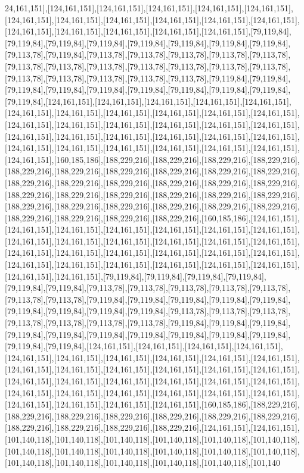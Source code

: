 24,161,151],[124,161,151],[124,161,151],[124,161,151],[124,161,151],[124,161,151],[124,161,151],[124,161,151],[124,161,151],[124,161,151],[124,161,151],[124,161,151],[124,161,151],[124,161,151],[124,161,151],[124,161,151],[124,161,151],[79,119,84],[79,119,84],[79,119,84],[79,119,84],[79,119,84],[79,119,84],[79,119,84],[79,119,84],[79,113,78],[79,119,84],[79,113,78],[79,113,78],[79,113,78],[79,113,78],[79,113,78],[79,113,78],[79,113,78],[79,113,78],[79,113,78],[79,113,78],[79,113,78],[79,113,78],[79,113,78],[79,113,78],[79,113,78],[79,113,78],[79,113,78],[79,119,84],[79,119,84],[79,119,84],[79,119,84],[79,119,84],[79,119,84],[79,119,84],[79,119,84],[79,119,84],[79,119,84],[124,161,151],[124,161,151],[124,161,151],[124,161,151],[124,161,151],[124,161,151],[124,161,151],[124,161,151],[124,161,151],[124,161,151],[124,161,151],[124,161,151],[124,161,151],[124,161,151],[124,161,151],[124,161,151],[124,161,151],[124,161,151],[124,161,151],[124,161,151],[124,161,151],[124,161,151],[124,161,151],[124,161,151],[124,161,151],[124,161,151],[124,161,151],[124,161,151],[124,161,151],[124,161,151],[160,185,186],[188,229,216],[188,229,216],[188,229,216],[188,229,216],[188,229,216],[188,229,216],[188,229,216],[188,229,216],[188,229,216],[188,229,216],[188,229,216],[188,229,216],[188,229,216],[188,229,216],[188,229,216],[188,229,216],[188,229,216],[188,229,216],[188,229,216],[188,229,216],[188,229,216],[188,229,216],[188,229,216],[188,229,216],[188,229,216],[188,229,216],[188,229,216],[188,229,216],[188,229,216],[188,229,216],[188,229,216],[188,229,216],[160,185,186],[124,161,151],[124,161,151],[124,161,151],[124,161,151],[124,161,151],[124,161,151],[124,161,151],[124,161,151],[124,161,151],[124,161,151],[124,161,151],[124,161,151],[124,161,151],[124,161,151],[124,161,151],[124,161,151],[124,161,151],[124,161,151],[124,161,151],[124,161,151],[124,161,151],[124,161,151],[124,161,151],[124,161,151],[124,161,151],[124,161,151],[124,161,151],[79,119,84],[79,119,84],[79,119,84],[79,119,84],[79,119,84],[79,119,84],[79,113,78],[79,113,78],[79,113,78],[79,113,78],[79,113,78],[79,113,78],[79,113,78],[79,119,84],[79,119,84],[79,119,84],[79,119,84],[79,119,84],[79,119,84],[79,119,84],[79,119,84],[79,119,84],[79,113,78],[79,113,78],[79,113,78],[79,113,78],[79,113,78],[79,113,78],[79,113,78],[79,119,84],[79,119,84],[79,119,84],[79,119,84],[79,119,84],[79,119,84],[79,119,84],[79,119,84],[79,119,84],[79,119,84],[79,119,84],[79,119,84],[124,161,151],[124,161,151],[124,161,151],[124,161,151],[124,161,151],[124,161,151],[124,161,151],[124,161,151],[124,161,151],[124,161,151],[124,161,151],[124,161,151],[124,161,151],[124,161,151],[124,161,151],[124,161,151],[124,161,151],[124,161,151],[124,161,151],[124,161,151],[124,161,151],[124,161,151],[124,161,151],[124,161,151],[124,161,151],[124,161,151],[124,161,151],[124,161,151],[124,161,151],[124,161,151],[124,161,151],[124,161,151],[160,185,186],[188,229,216],[188,229,216],[188,229,216],[188,229,216],[188,229,216],[188,229,216],[188,229,216],[188,229,216],[188,229,216],[188,229,216],[188,229,216],[124,161,151],[124,161,151],[101,140,118],[101,140,118],[101,140,118],[101,140,118],[101,140,118],[101,140,118],[101,140,118],[101,140,118],[101,140,118],[101,140,118],[101,140,118],[101,140,118],[101,140,118],[101,140,118],[101,140,118],[101,140,118],[101,140,118],[101,140